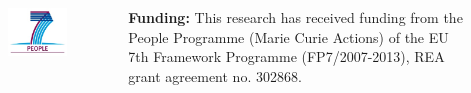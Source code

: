\documentclass[25pt, a0paper, portrait, margin=0mm, innermargin=15mm,
     blockverticalspace=15mm, colspace=15mm, subcolspace=8mm]{tikzposter}
\begin{document}
\begin{columns}
{\begin{figure}
	\includegraphics[scale=3]{fp7.jpg}
	\end{figure}
	\textbf{Funding:} This research has received funding 
	from the People Programme (Marie Curie Actions) of the EU 7th Framework
	Programme (FP7/2007-2013), REA grant agreement no. 302868.
    
}


\end{columns}

\end{document}
